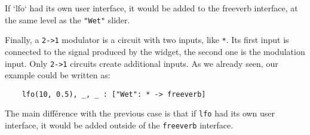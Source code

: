 If `lfo` had its own user interface, it would be added to the freeverb interface, at the same level as the \lstinline`"Wet"` slider. 

Finally, a \lstinline`2->1` modulator is a circuit with two inputs, like \lstinline`*`. Its first input is connected to the signal produced by the widget, the second one is the modulation input. Only \lstinline`2->1` circuits create additional inputs. As we already seen, our example could be written as:

\begin{lstlisting}
	lfo(10, 0.5), _, _ : ["Wet": * -> freeverb]
\end{lstlisting}
	
The main différence with the previous case is that if \lstinline`lfo` had its own user interface, it would be added outside of the \lstinline`freeverb` interface.
